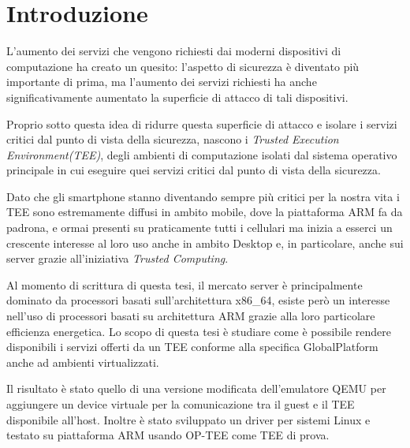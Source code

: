 \documentclass[12pt,italian]{report}
\begin{document}
\frontespizio
\afterpreface

\chapter{Introduzione}
\label{cap:introduzione}

L'aumento dei servizi che vengono richiesti dai moderni dispositivi di
computazione ha creato un quesito: l'aspetto di sicurezza è diventato più
importante di prima, ma l'aumento dei servizi richiesti ha anche
significativamente aumentato la superficie di attacco di tali dispositivi.

Proprio sotto questa idea di ridurre questa superficie di attacco e isolare
i servizi critici dal punto di vista della sicurezza, nascono i
\textit{Trusted Execution Environment(TEE)}, degli ambienti di computazione
isolati dal sistema operativo principale in cui eseguire quei servizi critici
dal punto di vista della sicurezza.

Dato che gli smartphone stanno diventando sempre più critici per la nostra vita
i TEE sono estremamente diffusi in ambito mobile, dove la piattaforma ARM fa da
padrona, e ormai presenti su praticamente tutti i cellulari ma inizia a esserci
un crescente interesse al loro uso anche in ambito Desktop e, in particolare,
anche sui server grazie all'iniziativa \textit{Trusted Computing}.

Al momento di scrittura di questa tesi, il mercato server è principalmente
dominato da processori basati sull'architettura x86\_64, esiste però un
interesse nell'uso di processori basati su architettura ARM grazie alla loro
particolare efficienza energetica.
Lo scopo di questa tesi è studiare come è possibile rendere disponibili i
servizi offerti da un TEE conforme alla specifica GlobalPlatform anche ad
ambienti virtualizzati.

Il risultato è stato quello di una versione modificata dell'emulatore QEMU
per aggiungere un device virtuale per la comunicazione tra il guest e il TEE
disponibile all'host. Inoltre è stato sviluppato un driver per sistemi Linux
e testato su piattaforma ARM usando OP-TEE come TEE di prova.
\end{document}
